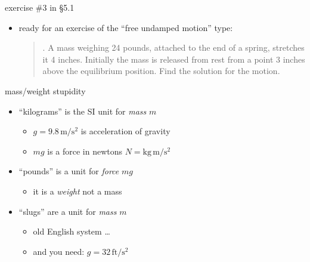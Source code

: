 \documentclass[urlcolor=blue,dvipsnames]{beamer}
\begin{document}
\begin{frame}{exercise \#3 in \S5.1}

\begin{itemize}
\item ready for an exercise of the ``free undamped motion'' type:

\begin{quotation}
. A mass weighing 24 pounds, attached to the end of a spring, stretches it 4 inches.  Initially the mass is released from rest from a point 3 inches above the equilibrium position.  Find the solution for the motion.
\end{quotation}
\end{itemize}

\vspace{40mm}
\end{frame}


\begin{frame}{mass/weight stupidity}

\begin{itemize}
\item ``kilograms'' is the SI unit for \emph{mass} $m$
    \begin{itemize}
    \item $g=9.8 \,\text{m}/\text{s}^2$ is acceleration of gravity
    \item $mg$ is a force in newtons $N = \text{kg}\,\text{m}/\text{s}^2$
    \end{itemize}
\item ``pounds'' is a unit for \emph{force} $mg$
    \begin{itemize}
    \item it is a \emph{weight} not a mass
    \end{itemize}
\item ``slugs'' are a unit for \emph{mass} $m$
    \begin{itemize}
    \item old English system \dots
    \item and you need: $g=32 \,\text{ft}/\text{s}^2$
    \end{itemize}
\end{itemize}
\end{frame}
\end{document}
